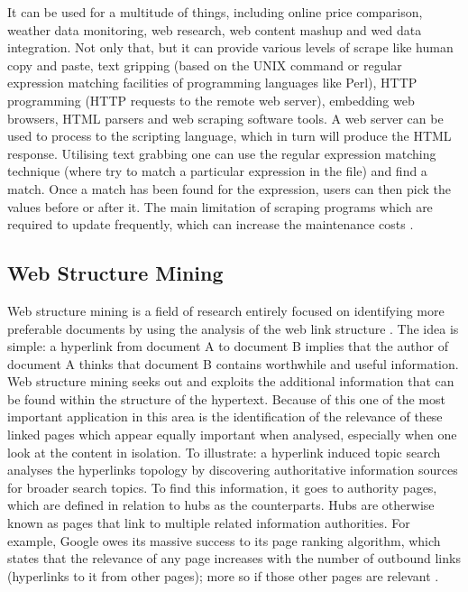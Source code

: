 It can be used for a multitude of things, including online price comparison, weather data monitoring, web research, web content mashup and wed data integration. Not only that, but it can provide various levels of scrape like human copy and paste, text gripping (based on the UNIX command or regular expression matching facilities of programming languages like Perl), HTTP programming (HTTP requests to the remote web server), embedding web browsers, HTML parsers and web scraping software tools. A web server can be used to process to the scripting language, which in turn will produce the HTML response. Utilising text grabbing one can use the regular expression matching technique (where try to match a particular expression in the file) and find a match. Once a match has been found for the expression, users can then pick the values before or after it. The main limitation of scraping programs which are required to update frequently, which can increase the maintenance costs \cite{munzert2015automated}.

\subsection{Web Structure Mining}

Web structure mining is a field of research entirely focused on identifying more preferable documents by using the analysis of the web link structure \cite{kosala2000web}. The idea is simple: a hyperlink from document A to document B implies that the author of document A thinks that document B contains worthwhile and useful information. Web structure mining seeks out and exploits the additional information that can be found within the structure of the hypertext. Because of this one of the most important application in this area is the identification of the relevance of these linked pages which appear equally important when analysed, especially when one look at the content in isolation. To illustrate: a hyperlink induced topic search analyses the hyperlinks topology by discovering authoritative information sources for broader search topics. To find this information, it goes to authority pages, which are defined in relation to hubs as the counterparts. Hubs are otherwise known as pages that link to multiple related information authorities. For example, Google owes its massive success to its page ranking algorithm, which states that the relevance of any page increases with the number of outbound links (hyperlinks to it from other pages); more so if those other pages are relevant \cite{renu2014implementation}.

